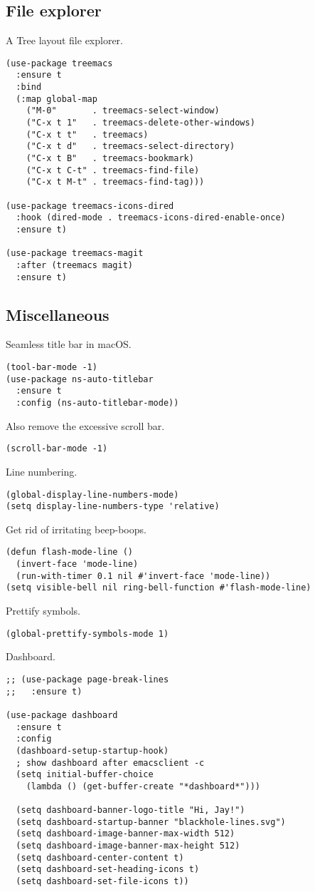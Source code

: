\documentclass[a4paper,11pt]{article}
\begin{document}
\subsection{File explorer}
\label{sec:orgfb9c1ed}
A Tree layout file explorer.
\begin{verbatim}
(use-package treemacs
  :ensure t
  :bind
  (:map global-map
    ("M-0"       . treemacs-select-window)
    ("C-x t 1"   . treemacs-delete-other-windows)
    ("C-x t t"   . treemacs)
    ("C-x t d"   . treemacs-select-directory)
    ("C-x t B"   . treemacs-bookmark)
    ("C-x t C-t" . treemacs-find-file)
    ("C-x t M-t" . treemacs-find-tag)))

(use-package treemacs-icons-dired
  :hook (dired-mode . treemacs-icons-dired-enable-once)
  :ensure t)

(use-package treemacs-magit
  :after (treemacs magit)
  :ensure t)
\end{verbatim}

\subsection{Miscellaneous}
\label{sec:org043520c}
Seamless title bar in macOS.
\begin{verbatim}
(tool-bar-mode -1)
(use-package ns-auto-titlebar
  :ensure t
  :config (ns-auto-titlebar-mode))
\end{verbatim}

Also remove the excessive scroll bar.
\begin{verbatim}
(scroll-bar-mode -1)
\end{verbatim}

Line numbering.
\begin{verbatim}
(global-display-line-numbers-mode)
(setq display-line-numbers-type 'relative)
\end{verbatim}

Get rid of irritating beep-boops.
\begin{verbatim}
(defun flash-mode-line ()
  (invert-face 'mode-line)
  (run-with-timer 0.1 nil #'invert-face 'mode-line))
(setq visible-bell nil ring-bell-function #'flash-mode-line)
\end{verbatim}

Prettify symbols.
\begin{verbatim}
(global-prettify-symbols-mode 1)
\end{verbatim}

Dashboard.
\begin{verbatim}
;; (use-package page-break-lines
;;   :ensure t)

(use-package dashboard
  :ensure t
  :config
  (dashboard-setup-startup-hook)
  ; show dashboard after emacsclient -c
  (setq initial-buffer-choice
    (lambda () (get-buffer-create "*dashboard*")))

  (setq dashboard-banner-logo-title "Hi, Jay!")
  (setq dashboard-startup-banner "blackhole-lines.svg")
  (setq dashboard-image-banner-max-width 512)
  (setq dashboard-image-banner-max-height 512)
  (setq dashboard-center-content t)
  (setq dashboard-set-heading-icons t)
  (setq dashboard-set-file-icons t))
\end{verbatim}
\end{document}
